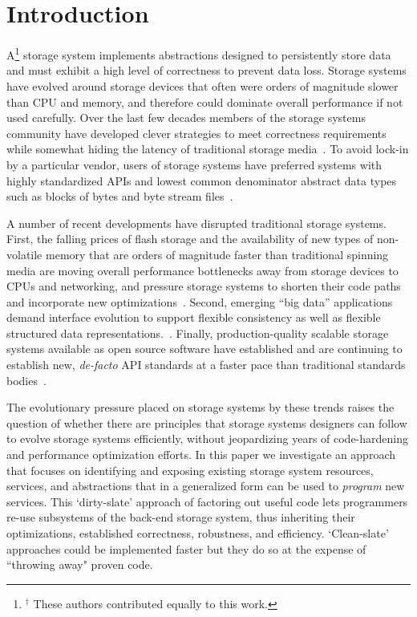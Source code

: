\section{Introduction}
\label{introduction}
\label{sec:intro}

A{\let\thefootnote\relax\footnote{$^{\dag}$ These authors contributed equally to
this work.}} storage system implements abstractions designed to persistently
store data and must exhibit a high level of correctness to prevent data loss.
Storage systems have evolved around storage devices that often were orders of
magnitude slower than CPU and memory, and therefore could dominate overall
performance if not used carefully. Over the last few decades members of the
storage systems community have developed clever strategies to meet correctness
requirements while somewhat hiding the latency of traditional storage
media~\cite{brewer_disks_2016}. To avoid lock-in by a particular vendor, users
of storage systems have preferred systems with highly standardized APIs and
lowest common denominator abstract data types such as blocks of bytes and byte
stream files~\cite{armbrust_view_2010}.

A number of recent developments have disrupted traditional storage systems.
First, the falling prices of flash storage and the availability of new types of
non-volatile memory that are orders of magnitude faster than traditional
spinning media are moving overall performance bottlenecks away from storage
devices to CPUs and networking, and pressure storage systems to shorten their
code paths and incorporate new
optimizations~\cite{gray_tape_2007,gray_flash_2008}.  Second, emerging ``big
data'' applications demand interface evolution to support flexible consistency
as well as flexible structured data
representations.~\cite{apache_contributors_parquet_2014}.  Finally,
production-quality scalable storage systems available as open source software
have established and are continuing to establish new, \emph{de-facto} API
standards at a faster pace than traditional standards
bodies~\cite{snia_implementing_2014,linux_foundation_kinetic_2015}.

The evolutionary pressure placed on storage systems by these trends raises the
question of whether there are principles that storage systems designers can
follow to evolve storage systems efficiently, without jeopardizing years of
code-hardening and performance optimization efforts.  In this paper we
investigate an approach that focuses on identifying and exposing existing
storage system resources, services, and abstractions that in a generalized form
can be used to \emph{program} new services. This `dirty-slate' approach of
factoring out useful code lets programmers re-use subsystems of the back-end
storage system, thus inheriting their optimizations, established correctness,
robustness, and efficiency. `Clean-slate' approaches could be implemented
faster but they do so at the expense of ``throwing away" proven code.

